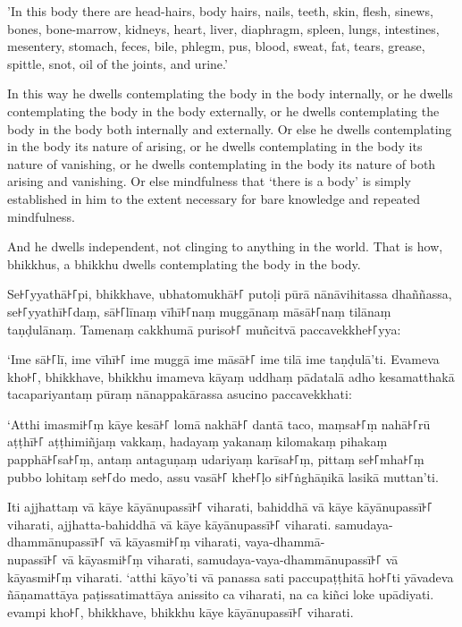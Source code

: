 'In this body there are head-hairs, body hairs, nails, teeth, skin, flesh,
sinews, bones, bone-marrow, kidneys, heart, liver, diaphragm, spleen, lungs,
intestines, mesentery, stomach, feces, bile, phlegm, pus, blood, sweat, fat,
tears, grease, spittle, snot, oil of the joints, and urine.'

In this way he dwells contemplating the body in the body internally, or he
dwells contemplating the body in the body externally, or he dwells contemplating
the body in the body both internally and externally. Or else he dwells
contemplating in the body its nature of arising, or he dwells contemplating in
the body its nature of vanishing, or he dwells contemplating in the body its
nature of both arising and vanishing. Or else mindfulness that ‘there is a body’
is simply established in him to the extent necessary for bare knowledge and
repeated mindfulness.

And he dwells independent, not clinging to anything in the world. That is how,
bhikkhus, a bhikkhu dwells contemplating the body in the body.


\paliPage

Se꜔꜒yyathā꜔꜒pi, bhikkhave, ubhatomukhā꜔꜒ putoḷi pūrā nānāvihitassa dhaññassa,
se꜔꜒yyathī꜔꜒daṃ, sā꜔꜒līnaṃ vīhī꜔꜒naṃ muggānaṃ māsā꜔꜒naṃ tilānaṃ taṇḍulānaṃ. Tamenaṃ
cakkhumā puriso꜔꜒ muñcitvā paccavekkhe꜔꜒yya:

‘Ime sā꜔꜒lī, ime vīhī꜔꜒ ime muggā ime māsā꜔꜒ ime tilā ime taṇḍulā’ti. Evameva kho꜔꜒,
bhikkhave, bhikkhu imameva kāyaṃ uddhaṃ pādatalā adho kesamatthakā
tacapariyantaṃ pūraṃ nānappakārassa asucino paccavekkhati:

‘Atthi imasmi꜔꜒ṃ kāye kesā꜔꜒ lomā nakhā꜔꜒ dantā taco, maṃsa꜔꜒ṃ nahā꜔꜒rū aṭṭhī꜔꜒ aṭṭhimiñjaṃ
vakkaṃ, hadayaṃ yakanaṃ kilomakaṃ pihakaṃ papphā꜔꜒sa꜔꜒ṃ, antaṃ antaguṇaṃ udariyaṃ
karīsa꜔꜒ṃ, pittaṃ se꜔꜒mha꜔꜒ṃ pubbo lohitaṃ se꜔꜒do medo, assu vasā꜔꜒ khe꜔꜒ḷo si꜔꜒ṅghāṇikā
lasikā muttan’ti.

Iti ajjhattaṃ vā kāye kāyānupassī꜔꜒ viharati, bahiddhā vā kāye kāyānupassī꜔꜒
viharati, ajjhatta-bahiddhā vā kāye kāyānupassī꜔꜒ viharati. samudaya-dhammānupassī꜔꜒
vā kāyasmi꜔꜒ṃ viharati, vaya-dhammā-\\
nupassī꜔꜒ vā kāyasmi꜔꜒ṃ viharati, samudaya-vaya-dhammānupassī꜔꜒ vā kāyasmi꜔꜒ṃ viharati.
‘atthi kāyo’ti vā panassa sati paccupaṭṭhitā ho꜔꜒ti yāvadeva ñāṇamattāya
paṭissatimattāya anissito ca viharati, na ca kiñci loke upādiyati. evampi kho꜔꜒,
bhikkhave, bhikkhu kāye kāyānupassī꜔꜒ viharati.

